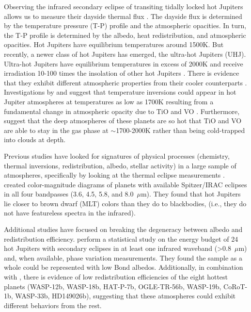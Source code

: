 Observing the infrared secondary eclipse of transiting tidally locked hot Jupiters allows us to measure their  dayside thermal flux \citep[e.g.,][]{Charbonneau2005, Deming2005a, Cowan2011a, Cowan2011b,Triaud2014c, Schwartz2015, Schwartz2017, Zhang2018c,Garhart2020}. The dayside flux is determined by the temperature pressure (T-P) profile and the atmospheric opacities. In turn, the T-P profile is determined by the albedo, heat redistribution, and  atmospheric opacities.
Hot Jupiters have equilibrium temperatures around 1500K. But recently, a newer class of hot Jupiters has emerged, the ultra-hot Jupiters (UHJ). Ultra-hot Jupiters have equilibrium temperatures in excess of 2000K and receive irradiation 10-100 times the insolation of other hot Jupiters \citep[e.g., Figure 9.][]{Parmentier2018b}. There is evidence that they exhibit different atmospheric properties from their cooler counterparts \citep[e.g.,][]{Bell2017, Arcangeli2018, Mansfield2018b, Parmentier2018b, Kreidberg2018b}. Investigations by \citet{Hubeny2003, Fortney2006b} and \citet{Fortney2008} suggest that temperature inversions could appear in hot Jupiter atmospheres at temperatures as low as 1700K resulting from a fundamental change in atmospheric opacity due to TiO and VO \citep{Gandhi2019}. Furthermore, \citet{Thorngren2019} suggest that the deep atmospheres of these planets are so hot that TiO and VO are able to stay in the gas phase at $\sim$1700-2000K rather than being cold-trapped into clouds at depth.


Previous studies have looked for signatures of physical processes (chemistry, thermal inversions, redistribution, albedo, stellar activity) in a large sample of atmospheres, specifically by looking at the thermal eclipse measurements \citep{Knutson2010, Cowan2011b, Triaud2014c, Schwartz2015, Schwartz2017, Zhang2018a, Garhart2020, Keating2019, Melville2020}. \citet{Triaud2014c} created color-magnitude diagrams of planets with available Spitzer/IRAC eclipses in all four bandpasses (3.6, 4.5, 5.8, and 8.0~$\mu$m). They found that hot Jupiters lie closer to brown dwarf (MLT) colors than they do to blackbodies, (i.e., they do not have featureless spectra in the infrared).


Additional studies have focused on breaking the degeneracy between albedo and redistribution efficiency. \citet{Cowan2011b} perform a statistical study on the energy budget of 24 hot Jupiters with secondary eclipses in at least one infrared waveband (>0.8~$\mu$m) and, when available, phase variation measurements. They found the sample as a whole could be represented with low Bond albedos. Additionally, in combination with \citet{Zhang2018a}, there is evidence of low redistribution efficiencies of the eight hottest planets (WASP-12b, WASP-18b, HAT-P-7b, OGLE-TR-56b, WASP-19b, CoRoT-1b, WASP-33b, HD149026b), suggesting that these atmospheres could exhibit different behaviors from the rest.

